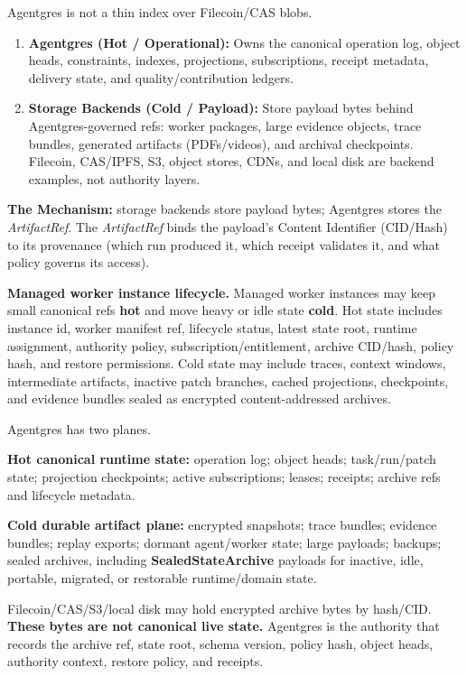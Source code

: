 \documentclass[
  11pt,
]{article}
\providecommand{\tightlist}{%
  \setlength{\itemsep}{0pt}\setlength{\parskip}{0pt}}
\begin{document}
Agentgres is not a thin index over Filecoin/CAS blobs.

\begin{enumerate}
\def\labelenumi{\arabic{enumi}.}
\tightlist
\item
  \textbf{Agentgres (Hot / Operational):} Owns the canonical operation
  log, object heads, constraints, indexes, projections, subscriptions,
  receipt metadata, delivery state, and quality/contribution ledgers.
\item
  \textbf{Storage Backends (Cold / Payload):} Store payload bytes behind
  Agentgres-governed refs: worker packages, large evidence objects, trace
  bundles, generated artifacts (PDFs/videos), and archival checkpoints.
  Filecoin, CAS/IPFS, S3, object stores, CDNs, and local disk are backend
  examples, not authority layers.
\end{enumerate}

\textbf{The Mechanism:} storage backends store payload bytes; Agentgres
stores the \emph{ArtifactRef}. The \emph{ArtifactRef} binds the
payload's Content Identifier (CID/Hash) to its provenance (which run
produced it, which receipt validates it, and what policy governs its
access).

\textbf{Managed worker instance lifecycle.} Managed worker instances may
keep small canonical refs \textbf{hot} and move heavy or idle state
\textbf{cold}. Hot state includes instance id, worker manifest ref,
lifecycle status, latest state root, runtime assignment, authority
policy, subscription/entitlement, archive CID/hash, policy hash, and
restore permissions. Cold state may include traces, context windows,
intermediate artifacts, inactive patch branches, cached projections,
checkpoints, and evidence bundles sealed as encrypted content-addressed
archives.

Agentgres has two planes.

\textbf{Hot canonical runtime state:} operation log; object heads;
task/run/patch state; projection checkpoints; active subscriptions;
leases; receipts; archive refs and lifecycle metadata.

\textbf{Cold durable artifact plane:} encrypted snapshots; trace
bundles; evidence bundles; replay exports; dormant agent/worker state;
large payloads; backups; sealed archives, including
\textbf{SealedStateArchive} payloads for inactive, idle, portable,
migrated, or restorable runtime/domain state.

Filecoin/CAS/S3/local disk may hold encrypted archive bytes by hash/CID.
\textbf{These bytes are not canonical live state.} Agentgres is the
authority that records the archive ref, state root, schema version,
policy hash, object heads, authority context, restore policy, and
receipts.
\end{document}
